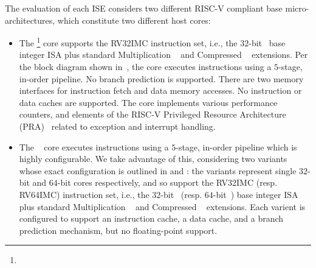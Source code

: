 
The evaluation of each ISE considers two different RISC-V compliant base
micro-architectures, which constitute two different host cores:

\begin{itemize}
\item The \footnote{%
      } core 
      supports the 
      RV32IMC 
      instruction set, i.e.,
      the 
             $32$-bit~\cite[Section 2]{RV:ISA:I:19} 
      base integer ISA plus 
      standard 
      Multiplication ~\cite[Section  7]{RV:ISA:I:19}
      and
      Compressed ~\cite[Section 16]{RV:ISA:I:19}
      extensions.
      Per the block diagram shown in~,
      the core 
      executes instructions using a $5$-stage, in-order pipeline.
      No branch prediction is supported.
      There are two memory interfaces for instruction fetch and data memory
      accesses.
      No instruction or data caches are supported.
      The core implements various performance counters,
      and
      elements of the
      RISC-V Privileged Resource Architecture (PRA)~\cite[Chapter 3]{RV:ISA:II:17}
      related to exception and interrupt handling.

\item The ~\cite{rocket:16} 
        core
      executes instructions using a $5$-stage, in-order pipeline
      which is highly configurable.
      We take advantage of this, considering two variants whose
      exact configuration is outlined in
      and 
      :
      the variants represent single $32$-bit and $64$-bit cores respectively,
      and so
      support  the 
      RV32IMC 
      (resp. RV64IMC)
      instruction set, i.e.,
      the 
             $32$-bit~\cite[Section 2]{RV:ISA:I:19} 
      (resp. $64$-bit~\cite[Section 5]{RV:ISA:I:19})
      base integer ISA plus 
      standard 
      Multiplication ~\cite[Section  7]{RV:ISA:I:19}
      and
      Compressed ~\cite[Section 16]{RV:ISA:I:19}
      extensions.
      Each varient is configured to support
      an instruction cache, 
      a  data        cache,
      and
      a  branch prediction mechanism,
      but 
      no floating-point support.

\end{itemize}

